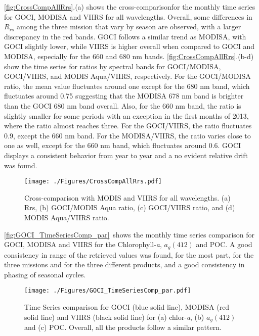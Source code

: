 \documentclass[onecolumn,3p,letterpaper,11pt]{elsarticle}
\begin{document}
\autoref{fig:CrossCompAllRrs}.(a) shows the cross-comparisonfor the monthly time series for GOCI, MODISA and VIIRS for all wavelengths. 
Overall, some differences in $R_{rs}$ among the three mission that vary by season are observed, with a larger discrepancy in the red bands. 
GOCI follows a similar trend as MODISA, with GOCI slightly lower, while VIIRS is higher overall when compared to GOCI and MODISA, especially for the 660 and 680 nm bands.
\autoref{fig:CrossCompAllRrs}.(b-d) show the time series for ratios by spectral bands for GOCI/MODISA, GOCI/VIIRS, and MODIS Aqua/VIIRS, respectively. For the GOCI/MODISA ratio, the mean value fluctuates around one except for the 680 nm band, which fluctuates around 0.75 suggesting that the MODISA 678 nm band is brighter than the GOCI 680 nm band overall. Also, for the 660 nm band, the ratio is slightly smaller for some periods with an exception in the first months of 2013, where the ratio almost reaches three. For the GOCI/VIIRS, the ratio fluctuates 0.9, except the 660 nm band. For the MODISA/VIIRS, the ratio varies close to one as well, except for the 660 nm band, which fluctuates around 0.6. GOCI displays a consistent behavior from year to year and a no evident relative drift was found.
\begin{figure}[H]
  \centering
  \texttt{[image: ./Figures/CrossCompAllRrs.pdf]}
    \caption{Cross-comparison with MODIS and VIIRS for all wavelengths. (a) Rrs, (b) GOCI/MODIS Aqua ratio, (c) GOCI/VIIRS ratio, and (d) MODIS Aqua/VIIRS ratio. \label{fig:CrossCompAllRrs} } 
\end{figure}
\autoref{fig:GOCI_TimeSeriesComp_par}~shows the monthly time series comparison for GOCI, MODISA and VIIRS for the Chlorophyll-{\it a}, $a_g(412)$ and POC. A good consistency in range of the retrieved values was found, for the most part, for the three missions and for the three different products, and a good consistency in phasing of seasonal cycles.
\begin{figure}[H]
  \centering
  \texttt{[image: ./Figures/GOCI\_TimeSeriesComp\_par.pdf]}
    \caption{Time Series comparison for GOCI (blue solid line), MODISA (red solid line) and VIIRS (black solid line) for (a) chlor-{\it a}, (b) $a_g(412)$ and (c) POC. Overall, all the products follow a similar pattern. \label{fig:GOCI_TimeSeriesComp_par}} 
\end{figure}
\end{document}
